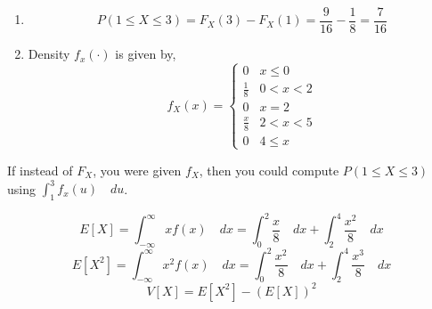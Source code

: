 \begin{solution} \quad \linebreak                                
\begin{enumerate}[noitemsep, topsep=0em]
\item
\[
    P(1 \leq X \leq 3) = F_X(3) - F_X(1)
                       = \frac{9}{16} - \frac{1}{8}
                       = \frac{7}{16}
\]
\item
Density $f_x(\cdot)$ is given by,
\[
    f_X(x) = \begin{cases}
        0                  & x \leq 0                                       \\
        \frac{1}{8}        & 0 < x < 2                                      \\
        0                  & x = 2                                          \\
        \frac{x}{8}        & 2 < x < 5                                      \\
        0                  & 4 \leq x
    \end{cases}
\]
\end{enumerate}
\begin{figure}[H]
    \centering
    \begin{multicols}{2}
    \def\svgwidth{\linewidth}
    
    \columnbreak
    \def\svgwidth{\linewidth}
    
    \end{multicols}
\end{figure}
\note If instead of $F_X$, you were given $f_X$, then you could compute $P(1
\leq X \leq 3)$ using $\int_{1}^{3} f_x(u) \quad du$.
\item
\[
    E[X] = \int_{-\infty}^{\infty} x f(x) \quad dx
         = \int_{0}^2 \frac{x}{8} \quad dx + 
           \int_{2}^4 \frac{x^2}{8} \quad dx
\]
\[
    E[X^2] = \int_{-\infty}^{\infty} x^2 f(x) \quad dx
           = \int_{0}^{2} \frac{x^2}{8} \quad dx +
             \int_{2}^{4} \frac{x^3}{8} \quad dx
\]
\[
    V[X] = E[X^2] - (E[X])^2 %
\]
\end{solution}

